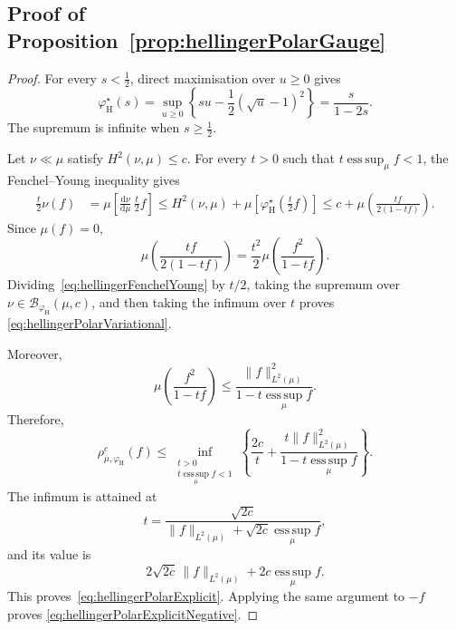 \documentclass[11pt]{article}
\theoremstyle{plain}
\theoremstyle{remark}
\begin{document}
\subsection{Proof of Proposition~\ref{prop:hellingerPolarGauge}}\label{app:proofHellingerPolarGauge}
\begin{proof}
    For every $s<\frac{1}{2}$, direct maximisation over $u\geq0$ gives
    \[
        \varphi_{\mathrm H}^{\star}(s)
        =
        \sup_{u\geq0}
        \left\{
        su-\frac{1}{2}(\sqrt{u}-1)^2
        \right\}
        =
        \frac{s}{1-2s}.
    \]
    The supremum is infinite when $s\geq\frac{1}{2}$.

    Let $\nu\ll\mu$ satisfy
    $H^2(\nu,\mu)\leq c$. For every $t>0$ such that
    $t\operatorname*{ess\,sup}_{\mu}f<1$, the
    Fenchel--Young inequality gives
    \begin{align}
        \frac{t}{2}\nu(f)
        &=
        \mu\left[
        \frac{\mathrm d\nu}{\mathrm d\mu}\,\frac{t}{2}f
        \right]\leq
        H^2(\nu,\mu)
        +
        \mu\left[
        \varphi_{\mathrm H}^{\star}\left(\frac{t}{2}f\right)
        \right]\leq
        c+
        \mu\left(
        \frac{tf}{2(1-tf)}
        \right).
        \label{eq:hellingerFenchelYoung}
    \end{align}
    Since $\mu(f)=0$,
    \[
        \mu\left(
        \frac{tf}{2(1-tf)}
        \right)
        =
        \frac{t^2}{2}\mu\left(
        \frac{f^2}{1-tf}
        \right).
    \]
    Dividing~\eqref{eq:hellingerFenchelYoung} by $t/2$,
    taking the supremum over
    $\nu\in\mathcal B_{\varphi_{\mathrm H}}(\mu,c)$,
    and then taking the infimum over $t$ proves
    \eqref{eq:hellingerPolarVariational}.

    Moreover,
    \[
        \mu\left(
        \frac{f^2}{1-tf}
        \right)
        \leq
        \frac{
        \lVert f\rVert_{L^2(\mu)}^2
        }{
        1-t\operatorname*{ess\,sup}_{\mu}f
        }.
    \]
    Therefore,
    \[
        \rho_{\mu,\varphi_{\mathrm H}}^c(f)
        \leq
        \inf_{\substack{t>0\\
        t\operatorname*{ess\,sup}_{\mu}f<1}}
        \left\{
        \frac{2c}{t}
        +
        \frac{
        t\lVert f\rVert_{L^2(\mu)}^2
        }{
        1-t\operatorname*{ess\,sup}_{\mu}f
        }
        \right\}.
    \]
    The infimum is attained at
    \[
        t
        =
        \frac{
        \sqrt{2c}
        }{
        \lVert f\rVert_{L^2(\mu)}
        +
        \sqrt{2c}\operatorname*{ess\,sup}_{\mu}f
        },
    \]
    and its value is
    \[
        2\sqrt{2c}\,
        \lVert f\rVert_{L^2(\mu)}
        +
        2c\operatorname*{ess\,sup}_{\mu}f.
    \]
    This proves~\eqref{eq:hellingerPolarExplicit}.
    Applying the same argument to $-f$ proves
    \eqref{eq:hellingerPolarExplicitNegative}.
\end{proof}
\end{document}
